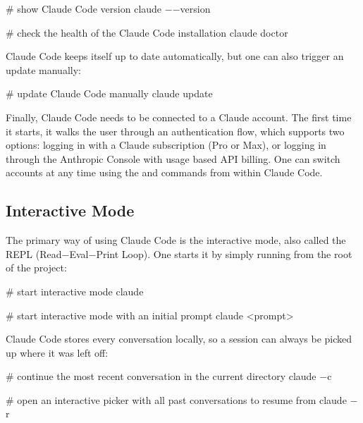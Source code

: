 \begin{bash}
# show Claude Code version
claude $-$$-$version
\end{bash}

\begin{bash}
# check the health of the Claude Code installation
claude doctor
\end{bash}

Claude Code keeps itself up to date automatically, but one can also trigger an update manually:

\begin{bash}
# update Claude Code manually
claude update
\end{bash}

Finally, Claude Code needs to be connected to a Claude account. The first time it starts, it walks the user through an
authentication flow, which supports two options: logging in with a Claude subscription (Pro or Max), or logging in
through the Anthropic Console with usage based API billing. One can switch accounts at any time using the
 and  commands from within Claude Code.

\subsection{Interactive Mode}

The primary way of using Claude Code is the interactive mode, also called the REPL (Read$-$Eval$-$Print Loop). One
starts it by simply running  from the root of the project:

\begin{bash}
# start interactive mode
claude
\end{bash}

\begin{bash}
# start interactive mode with an initial prompt
claude <prompt>
\end{bash}

Claude Code stores every conversation locally, so a session can always be picked up where it was left off:

\begin{bash}
# continue the most recent conversation in the current directory
claude $-$c
\end{bash}

\begin{bash}
# open an interactive picker with all past conversations to resume from
claude $-$r
\end{bash}

